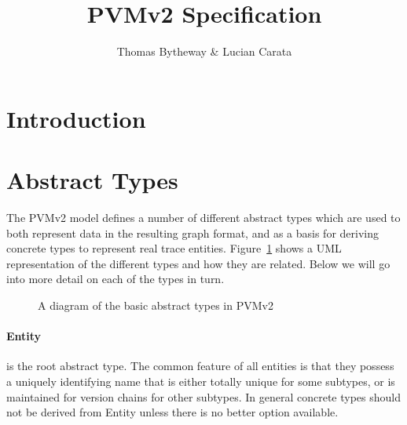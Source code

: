 \documentclass[12pt,twoside,openright,a4paper]{article}
\begin{document}
\title{PVMv2 Specification}
\author{Thomas Bytheway & Lucian Carata}

\begin{minipage}[h]{\textwidth}
    \maketitle
    \vspace{2in}
    {\small}
\end{minipage}

\normalsize



\clearpage

\section{Introduction}

\section{Abstract Types}
\label{sec:ty}
The PVMv2 model defines a number of different abstract types which are used to both represent data in the resulting graph format, and as a basis for deriving concrete types to represent real trace entities. Figure~\ref{fig:types} shows a UML representation of the different types and how they are related. Below we will go into more detail on each of the types in turn.

\begin{figure}[h]
\centering
{}
\caption{A diagram of the basic abstract types in PVMv2}
\label{fig:types}
\end{figure}

\paragraph{Entity}
\label{sec:ty:entity}
 is the root abstract type. The common feature of all entities is that they possess a uniquely identifying name that is either totally unique for some subtypes, or is maintained for version chains for other subtypes. In general concrete types should not be derived from Entity unless there is no better option available.
\end{document}
